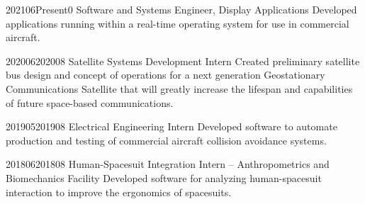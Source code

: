 \documentclass[../Gabriel_Roper_Resume]{subfiles}
\begin{document}

        {2021}{06}{Present}{0}
        {Software and Systems Engineer, Display Applications}
        {Developed applications running within a real-time operating
        system for use in commercial aircraft. }

        {2020}{06}{2020}{08}
        {Satellite Systems Development Intern}
        {Created preliminary satellite bus design and concept of operations
        for a next generation Geostationary Communications Satellite that will greatly increase the
        lifespan and capabilities of future space-based communications. }

        {2019}{05}{2019}{08}
        {Electrical Engineering Intern}
        {Developed software to automate production and testing of commercial aircraft
            collision avoidance systems.}

        {2018}{06}{2018}{08}
        {Human-Spacesuit Integration Intern -- Anthropometrics and Biomechanics Facility}
        {Developed software for analyzing human-spacesuit interaction to improve the ergonomics
            of spacesuits.}

\end{document}
